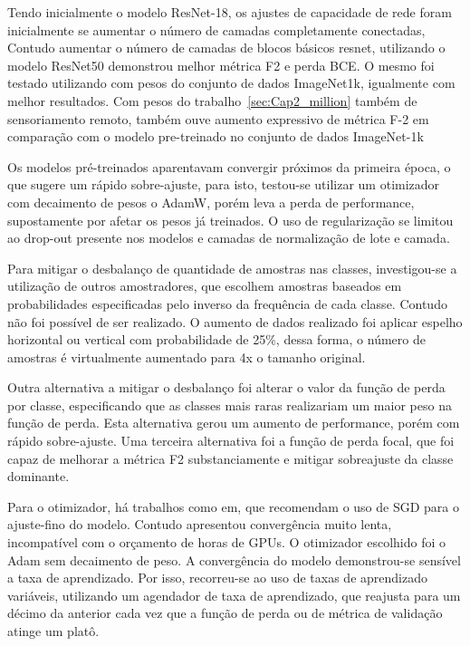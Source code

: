 Tendo inicialmente o modelo ResNet-18, os ajustes de capacidade de rede foram inicialmente se aumentar o número de camadas completamente conectadas, Contudo aumentar o número de camadas de blocos básicos resnet, utilizando o modelo ResNet50 demonstrou melhor métrica F2 e perda BCE. O mesmo foi testado utilizando com pesos do conjunto de dados ImageNet1k, igualmente com melhor resultados. Com pesos do trabalho~\ref{sec:Cap2_million} também de sensoriamento remoto, também ouve aumento expressivo de métrica F-2 em comparação com o modelo pre-treinado no conjunto de dados ImageNet-1k

Os modelos pré-treinados aparentavam convergir próximos da primeira época, o que sugere um rápido sobre-ajuste, para isto, testou-se utilizar um otimizador com decaimento de pesos o AdamW, porém leva a perda de performance, supostamente por afetar os pesos já treinados. O uso de regularização se limitou ao drop-out presente nos modelos e camadas de normalização de lote e camada.

Para mitigar o desbalanço de quantidade de amostras nas classes, investigou-se a utilização de outros amostradores, que escolhem amostras baseados em probabilidades especificadas pelo inverso da frequência de cada classe. Contudo não foi possível de ser realizado. O aumento de dados realizado foi aplicar espelho horizontal ou vertical com probabilidade de 25\%, dessa forma, o número de amostras é virtualmente aumentado para 4x o tamanho original.

Outra alternativa a mitigar o desbalanço foi alterar o valor da função de perda por classe, especificando que as classes mais raras realizariam um maior peso na função de perda. Esta alternativa gerou um aumento de performance, porém com rápido sobre-ajuste. Uma terceira alternativa foi a função de perda focal, que foi capaz de melhorar a métrica F2 substanciamente e mitigar sobreajuste da classe dominante.

Para o otimizador, há trabalhos como em\cite{https://doi.org/10.48550/arxiv.2106.10270}, que recomendam o uso de SGD para o ajuste-fino do modelo. Contudo apresentou convergência muito lenta, incompatível com o orçamento de horas de GPUs. O otimizador escolhido foi o Adam sem decaimento de peso. A convergência do modelo demonstrou-se sensível a taxa de aprendizado. Por isso, recorreu-se ao uso de taxas de aprendizado variáveis, utilizando um agendador de taxa de aprendizado, que reajusta para um décimo da anterior cada vez que a função de perda ou de métrica de validação atinge um platô.


